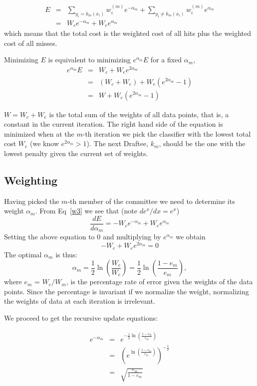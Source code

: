\documentclass[]{article}  %
\begin{document}
\begin{eqnarray}
E &=& \sum _{y_i = k_m(x_i)} w_i^{(m)} e^{-\alpha_m} +  \sum _{y_i \neq k_m(x_i)} w_i^{(m)} e^{\alpha_m} \\
 & =& W_c e^{-\alpha_m} + W_e e^{\alpha_m} \label{w3}
\end{eqnarray}
which means that the total cost is the weighted cost of all hits plus the weighted cost of all misses.

Minimizing $E$ is equivalent to minimizing $e^{\alpha_m}E$ for a fixed $\alpha_m$,
\begin{eqnarray}
e^{\alpha_m}E &= & W_c + W_e e^{2\alpha_m}\\
 & = & (W_c + W_e) + W_e ( e^{2\alpha_m} -1)\\
 & = & W + W_e ( e^{2\alpha_m} -1)
\end{eqnarray}

$W=W_c + W_e$ is the total sum of the weights of all data points, that is, a constant in the current iteration. The right hand side of the equation is minimized when at the $m$-th iteration we pick the classifier with the lowest total cost $W_e$ (we know $e^{2\alpha_m} > 1$). The next Draftee, $k_m$, should be the one with the lowest penalty given the current set of weights.

\subsection{Weighting}

Having picked the $m$-th member of the committee we need to determine its weight $\alpha_m$. From Eq~\ref{w3} we see that (note $de^x/dx = e^x$)
\[
\frac {dE}{d\alpha_m} = -W_ce^{-\alpha_m} + W_e e^{\alpha_m}
\]
Setting the above equation to 0 and multiplying by $e^{\alpha_m}$ we obtain
\[
-W_e + W_e e ^{2\alpha_m} = 0
\]
The optimal $\alpha_m$ is thus:
\[
\alpha_m = \frac{1}{2} \ln \left(\frac{W_c}{W_e}\right) = \frac{1}{2} \ln \left(\frac{1-e_m}{e_m}\right) ,
\]
where $e_m$ = $W_e/W_m$, is the percentage rate of error given the weights of the data points. Since the percentage is invariant if we normalize the weight, normalizing the weights of data at each iteration is irrelevant.

We proceed to get the recursive update equations:

\begin{eqnarray*}
e^{-\alpha_m} &=& e^{-\frac{1}{2} \ln \left(\frac{1-e_m}{e_m}\right)}\\
&=& (e^{\ln \left(\frac{1-e_m}{e_m}\right)})^{-\frac{1}{2}}\\
&=& \sqrt{\frac{e_m}{1-e_m}}
\end{eqnarray*}
\end{document}
